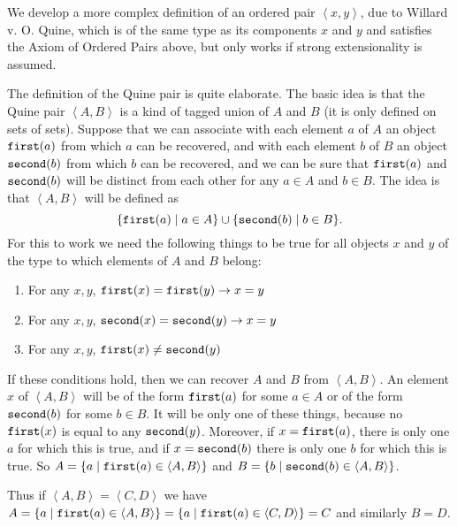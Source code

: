 \documentclass[12pt]{book}
\begin{document}
We develop a more complex definition of an ordered pair
$\left<x,y\right>$, due to Willard v. O. Quine, which is of the same
type as its components $x$ and $y$ and satisfies the Axiom of
Ordered Pairs above, but only works if strong extensionality is
assumed.

The definition of the Quine pair is quite elaborate.  The basic idea
is that the Quine pair $\left<A,B\right>$ is a kind of tagged union of
$A$ and $B$ (it is only defined on sets of sets).  Suppose that we can
associate with each element $a$ of $A$ an object ${\tt first}(a)$ from
which $a$ can be recovered, and with each element $b$ of $B$ an object
${\tt second}(b)$ from which $b$ can be recovered, and we can be sure
that ${\tt first}(a)$ and ${\tt second}(b)$ will be distinct from each
other for any $a \in A$ and $b \in B$.  The idea is that
$\left<A,B\right>$ will be defined as $$\{{\tt first}(a) \mid a \in
A\} \cup \{{\tt second}(b) \mid b \in B\}.$$ For this to work we need
the following things to be true for all objects $x$ and $y$ of the
type to which elements of $A$ and $B$ belong:

\begin{enumerate}

\item  For any $x,y$, ${\tt first}(x) = {\tt first}(y) \rightarrow x=y$

\item  For any $x,y$, ${\tt second}(x) = {\tt second}(y) \rightarrow x=y$

\item  For any $x,y$, ${\tt first}(x) \neq {\tt second}(y)$

\end{enumerate}

If these conditions hold, then we can recover $A$ and $B$ from
$\left<A,B\right>$.  An element $x$ of $\left<A,B\right>$ will be of
the form ${\tt first}(a)$ for some $a \in A$ or of the form ${\tt
second}(b)$ for some $b \in B$.  It will be only one of these things,
because no ${\tt first}(x)$ is equal to any ${\tt second}(y)$.
Moreover, if $x={\tt first}(a)$, there is only one $a$ for which this
is true, and if $x={\tt second}(b)$ there is only one $b$ for which
this is true.  So $A = \{a \mid {\tt first}(a) \in \left<A,B\right>\}$
and $B = \{b \mid {\tt second}(b) \in \left<A,B\right>\}$.

Thus if $\left<A,B\right> = \left<C,D\right>$ we have $A = \{a \mid
{\tt first}(a) \in \left<A,B\right>\} = \{a \mid {\tt first}(a) \in
\left<C,D\right>\} = C$ and similarly $B=D$.
\end{document}
